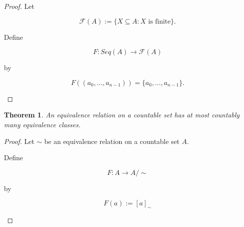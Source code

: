 \documentclass[10pt,a4paper]{book}
\newtheorem{theorem}{Theorem}[section]
\begin{document}
\begin{proof}

    Let

    \[
        \mathcal F(A)
        :=
        \{X\subseteq A : X \text{ is finite}\}.
    \]

    Define

    \[
        F:Seq(A)\to\mathcal F(A)
    \]

    by

    \[
        F((a_0,\ldots,a_{n-1}))
        =
        \{a_0,\ldots,a_{n-1}\}.
    \]

    \begin{fitchproof}[arrayenv=tabular]


        \open
        \close




    \end{fitchproof}

\end{proof}

\begin{theorem}
    An equivalence relation on a countable set has at most countably many equivalence classes.
\end{theorem}

\begin{proof}

    Let $ \sim $ be an equivalence relation on a countable set $A$.

    Define

    \[
        F:A\to A/ \sim
    \]

    by

    \[
        F(a):=[a]_\sim
    \]

    \begin{fitchproof}[arrayenv=tabular]


        \open
        \close



    \end{fitchproof}

\end{proof}
\end{document}
